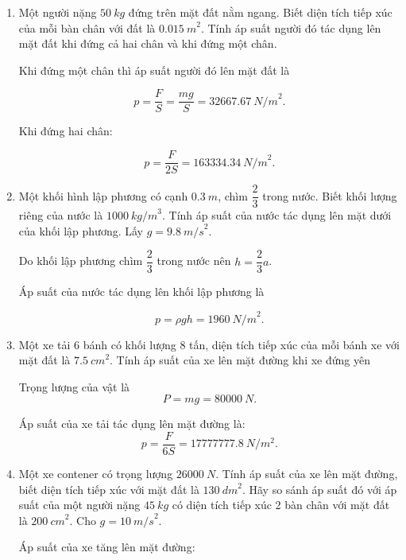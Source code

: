 \begin{enumerate}[label=\bfseries Câu \arabic*:]

	\item {}
	
	
	{
		Một người nặng $\SI{50}{kg}$ đứng trên mặt đất nằm ngang. Biết diện tích tiếp xúc của mỗi bàn chân với đất là $\SI{0,015}{m}^2$. Tính áp suất người đó tác dụng lên mặt đất khi đứng cả hai chân và khi đứng một chân.
	}
	
	\hideall
	{	
		Khi đứng một chân thì áp suất người đó lên mặt đất là 
		
		$$p = \dfrac{F}{S} = \dfrac{mg}{S} = \SI{32667,67}{N/m}^2.$$
		
		Khi đứng hai chân:
		
		$$p = \dfrac{F}{2S} = \SI{163334,34}{N/m}^2.$$
	}
	\item {}
	
	
	{
		Một khối hình lập phương có cạnh $\SI{0,3}{m}$, chìm $\dfrac{2}{3}$ trong nước. Biết khối lượng riêng của nước là $\SI{1000}{kg/m}^3$. Tính áp suất của nước tác dụng lên mặt dưới của khối lập phương. Lấy $g = \SI{9,8}{m/s}^2.$
	}
	
	\hideall
	{	
		Do khối lập phương chìm $\dfrac{2}{3}$ trong nước nên $ h= \dfrac{2}{3}a$.
		
		Áp suất của nước tác dụng lên khối lập phương là
		
		$$ p = \rho g h = \SI{1960}{N/m}^2.$$
		
		
	}
	
	\item {}
	
	
	{
		Một xe tải 6 bánh có khối lượng 8 tấn, diện tích tiếp xúc của mỗi bánh xe với mặt đất là $\SI{7,5}{cm}^2$. Tính áp suất của xe lên mặt đường khi xe đứng yên
	}
	
	\hideall
	{	
		Trọng lượng của vật là
		$$P = mg = \SI{80000}{N}.$$
		
		Áp suất của xe tải tác dụng lên mặt đường là: $$p=\dfrac{F}{6S}=\SI{17777777,8}{N/m^2}.$$
		 
	}
	\item {}
	
	
	{
		Một xe contener có trọng lượng $\SI{26000}{N}$. Tính áp suất của xe lên mặt đường, biết diện tích tiếp xúc với mặt đất là $\SI{130}{dm}^2$. Hãy so sánh áp suất đó với áp suất của một người nặng $\SI{45}{kg}$ có diện tích tiếp xúc 2 bàn chân với mặt đất là $\SI{200}{cm}^2$. Cho $g =\SI{10}{m/s}^2$.
	}
	
	\hideall
	{	
		Áp suất của xe tăng lên mặt đường:
		
}
\end{enumerate}
